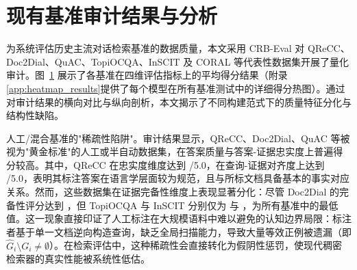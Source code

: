 \section{现有基准审计结果与分析}

\label{sec:audit_results}



为系统评估历史主流对话检索基准的数据质量，本文采用 CRB-Eval 对 QReCC、Doc2Dial、QuAC、TopiOCQA、InSCIT 及 CORAL 等代表性数据集开展了量化审计。图~\ref{fig:quality-asses} 展示了各基准在四维评估指标上的平均得分结果（附录\ref{app:heatmap_results}提供了每个模型在所有基准测试中的详细得分热图）。通过对审计结果的横向对比与纵向剖析，本文揭示了不同构建范式下的质量特征分化与结构性缺陷。

\begin{figure}[h]

    \centering



    \label{fig:quality-asses}

\end{figure}















人工/混合基准的"稀疏性陷阱"。审计结果显示，QReCC、Doc2Dial、QuAC 等被视为"黄金标准"的人工或半自动数据集，在答案质量与答案-证据忠实度上普遍得分较高。其中，QReCC 在忠实度维度达到 /5.0，在查询-证据对齐度上达到 /5.0，表明其标注答案在语言学层面较为规范，且与所标文档具备基本的事实对应关系。然而，这些数据集在证据完备性维度上表现显著分化：尽管 Doc2Dial 的完备性评分达到 ，但 TopiOCQA 与 InSCIT 分别仅为  与 ，为所有基准中的最低值。这一现象直接印证了人工标注在大规模语料中难以避免的认知边界局限：标注者基于单一文档逆向构造查询，缺乏全局扫描能力，导致大量等效正例被遗漏（即 $\hat{G}_i \setminus G_i \neq \emptyset$）。在检索评估中，这种稀疏性会直接转化为假阴性惩罚，使现代稠密检索器的真实性能被系统性低估。


